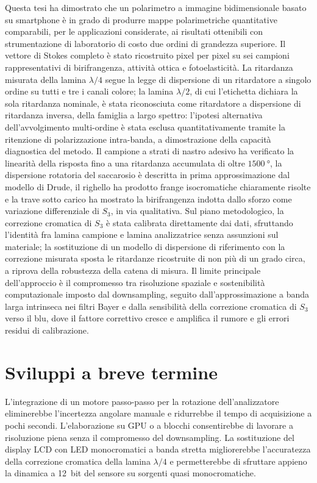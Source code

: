 
Questa tesi ha dimostrato che un polarimetro a immagine bidimensionale basato su smartphone è in grado di produrre mappe polarimetriche quantitative comparabili, per le applicazioni considerate, ai risultati ottenibili con strumentazione di laboratorio di costo due ordini di grandezza superiore. Il vettore di Stokes completo è stato ricostruito pixel per pixel su sei campioni rappresentativi di birifrangenza, attività ottica e fotoelasticità. La ritardanza misurata della lamina $\lambda/4$ segue la legge di dispersione di un ritardatore a singolo ordine su tutti e tre i canali colore; la lamina $\lambda/2$, di cui l'etichetta dichiara la sola ritardanza nominale, è stata riconosciuta come ritardatore a dispersione di ritardanza inversa, della famiglia a largo spettro: l'ipotesi alternativa dell'avvolgimento multi-ordine è stata esclusa quantitativamente tramite la ritenzione di polarizzazione intra-banda, a dimostrazione della capacità diagnostica del metodo. Il campione a strati di nastro adesivo ha verificato la linearità della risposta fino a una ritardanza accumulata di oltre $\SI{1500}{\degree}$, la dispersione rotatoria del saccarosio è descritta in prima approssimazione dal modello di Drude, il righello ha prodotto frange isocromatiche chiaramente risolte e la trave sotto carico ha mostrato la birifrangenza indotta dallo sforzo come variazione differenziale di $S_3$, in via qualitativa. Sul piano metodologico, la correzione cromatica di $S_3$ è stata calibrata direttamente dai dati, sfruttando l'identità fra lamina campione e lamina analizzatrice senza assunzioni sul materiale; la sostituzione di un modello di dispersione di riferimento con la correzione misurata sposta le ritardanze ricostruite di non più di un grado circa, a riprova della robustezza della catena di misura. Il limite principale dell'approccio è il compromesso tra risoluzione spaziale e sostenibilità computazionale imposto dal downsampling, seguito dall'approssimazione a banda larga intrinseca nei filtri Bayer e dalla sensibilità della correzione cromatica di $S_3$ verso il blu, dove il fattore correttivo cresce e amplifica il rumore e gli errori residui di calibrazione.


\section{Sviluppi a breve termine}
\label{sec:sviluppi_breve}

L'integrazione di un motore passo-passo per la rotazione dell'analizzatore eliminerebbe l'incertezza angolare manuale e ridurrebbe il tempo di acquisizione a pochi secondi. L'elaborazione su GPU o a blocchi consentirebbe di lavorare a risoluzione piena senza il compromesso del downsampling. La sostituzione del display LCD con LED monocromatici a banda stretta migliorerebbe l'accuratezza della correzione cromatica della lamina $\lambda/4$ e permetterebbe di sfruttare appieno la dinamica a 12~bit del sensore su sorgenti quasi monocromatiche.


